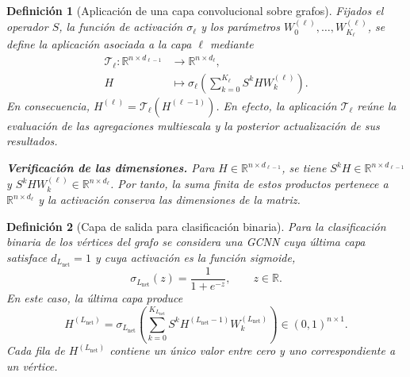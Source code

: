 \documentclass[a4paper,openany,oneside,10pt]{report}
\theoremstyle{pnlTeorema}
\theoremstyle{pnlDefinicion}
\newtheorem{definicion}{Definición}[section]
\theoremstyle{pnlObservacion}
\begin{document}
\begin{definicion}[Aplicación de una capa convolucional sobre grafos]
\label{def:gcnn-capa}
Fijados el operador $S$, la función de activación $\sigma_\ell$ y los parámetros $W_0^{(\ell)},\ldots,W_{K_\ell}^{(\ell)}$, se define la aplicación asociada a la capa $\ell$ mediante
\begin{equation}\label{eq:gcnn-capa}
\begin{aligned}
\mathcal T_\ell:\mathbb R^{n\times d_{\ell-1}}&\longrightarrow\mathbb R^{n\times d_\ell},\\
H&\longmapsto\sigma_\ell\!\left(\sum_{k=0}^{K_\ell}S^kHW_k^{(\ell)}\right).
\end{aligned}
\end{equation}
En consecuencia, $H^{(\ell)}=\mathcal T_\ell(H^{(\ell-1)})$. En efecto, la aplicación $\mathcal T_\ell$ reúne la evaluación de las agregaciones multiescala y la posterior actualización de sus resultados.

\textbf{Verificación de las dimensiones.} Para $H\in\mathbb R^{n\times d_{\ell-1}}$, se tiene $S^kH\in\mathbb R^{n\times d_{\ell-1}}$ y $S^kHW_k^{(\ell)}\in\mathbb R^{n\times d_\ell}$. Por tanto, la suma finita de estos productos pertenece a $\mathbb R^{n\times d_\ell}$ y la activación conserva las dimensiones de la matriz.
\end{definicion}

\begin{definicion}[Capa de salida para clasificación binaria]
\label{def:gcnn-salida}
Para la clasificación binaria de los vértices del grafo se considera una GCNN cuya última capa satisface $d_{L_{\mathrm{net}}}=1$ y cuya activación es la función sigmoide,
\[
\sigma_{L_{\mathrm{net}}}(z)=\frac1{1+e^{-z}},\qquad z\in\mathbb R.
\]
En este caso, la última capa produce
\[
H^{(L_{\mathrm{net}})}=
\sigma_{L_{\mathrm{net}}}\!\left(
\sum_{k=0}^{K_{L_{\mathrm{net}}}}S^kH^{(L_{\mathrm{net}}-1)}W_k^{(L_{\mathrm{net}})}
\right)\in(0,1)^{n\times1}.
\]
Cada fila de $H^{(L_{\mathrm{net}})}$ contiene un único valor entre cero y uno correspondiente a un vértice.
\end{definicion}
\end{document}
